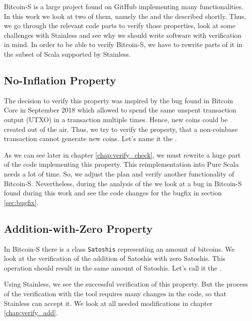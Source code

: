 Bitcoin-S is a large project found on GitHub implementing many functionalities.
In this work we look at two of them, namely the  and the  described shortly.
Thus, we go through the relevant code parts to verify those properties, look at some challenges with Stainless and see why we should write software with verification in mind.
In order to be able to verify Bitcoin-S, we have to rewrite parts of it in the subset of Scala supported by Stainless.


\subsection{No-Inflation Property}
\label{property_1}

The decision to verify this property was inspired by the bug found in Bitcoin Core in September 2018  \cite{cve201817144} which allowed to spend the same unspent transaction output (UTXO) in a transaction multiple times.
Hence, new coins could be created out of the air.
Thus, we try to verify the property, that a non-coinbase transaction cannot generate new coins.
Let's name it the .

As we can see later in chapter \ref{chap:verify_check}, we must rewrite a huge part of the code implementing this property.
This reimplementation into Pure Scala needs a lot of time.
So, we adjust the plan and verify another functionality of Bitcoin-S.
Nevertheless, during the analysis of the  we look at a bug in Bitcoin-S found during this work and see the code changes for the bugfix in section \ref{sec:bugfix}. 


\subsection{Addition-with-Zero Property}
\label{property_2}

In Bitcoin-S there is a class \texttt{Satoshis} representing an amount of bitcoins.
We look at the verification of the addition of Satoshis with zero Satoshis.
This operation should result in the same amount of Satoshis.
Let's call it the .

Using Stainless, we see the successful verification of this property.
But the process of the verification with the tool requires many changes in the code, so that Stainless can accept it.
We look at all needed modifications in chapter \ref{chap:verify_add}.
